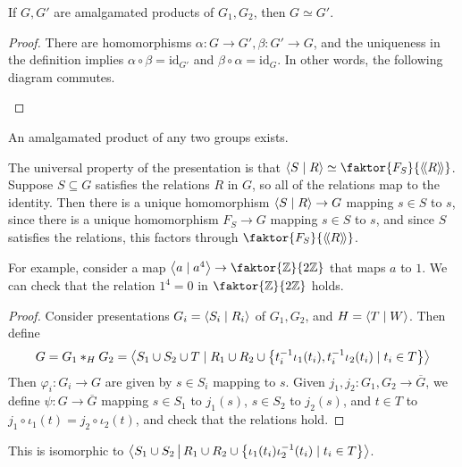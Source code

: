 \begin{proposition}
	If \( G, G' \) are amalgamated products of \( G_1, G_2 \), then \( G \simeq G' \).
\end{proposition}
\begin{proof}
	There are homomorphisms \( \alpha \colon G \to G', \beta \colon G' \to G \), and the uniqueness in the definition implies \( \alpha \circ \beta = \mathrm{id}_{G'} \) and \( \beta \circ \alpha = \mathrm{id}_G \).
	In other words, the following diagram commutes.
	\begin{center}
	\end{center}
\end{proof}
\begin{proposition}
	An amalgamated product of any two groups exists.
\end{proposition}
The universal property of the presentation is that \( \genset{S \mid R} \simeq \faktor{F_S}{\ngenset{R}} \).
Suppose \( S \subseteq G \) satisfies the relations \( R \) in \( G \), so all of the relations map to the identity.
Then there is a unique homomorphism \( \left\langle{} S \mid R \right\rangle \to G \) mapping \( s \in S \) to \( s \), since there is a unique homomorphism \( F_S \to G \) mapping \( s \in S \) to \( s \), and since \( S \) satisfies the relations, this factors through \( \faktor{F_S}{\ngenset{R}} \).

For example, consider a map \( \genset{a \mid a^4} \to \faktor{\mathbb Z}{2\mathbb Z} \) that maps \( a \) to \( 1 \).
We can check that the relation \( 1^4 = 0 \) in \( \faktor{\mathbb Z}{2\mathbb Z} \) holds.
\begin{proof}
	Consider presentations \( G_i = \left\langle{} S_i \mid R_i \right\rangle \) of \( G_1, G_2 \), and \( H = \left\langle{} T \mid W \right\rangle \).
	Then define
	\[ G = G_1 \ast_H G_2 = \left\langle{} S_1 \cup S_2 \cup T \mid R_1 \cup R_2 \cup \qty{t_i^{-1}\iota_1(t_i), t_i^{-1}\iota_2(t_i) \mid t_i \in T} \right\rangle \]
	Then \( \varphi_i \colon G_i \to G \) are given by \( s \in S_i \) mapping to \( s \).
	Given \( j_1, j_2 \colon G_1, G_2 \to \overline G \), we define \( \psi \colon G \to \overline G \) mapping \( s \in S_1 \) to \( j_1(s) \), \( s \in S_2 \) to \( j_2(s) \), and \( t \in T \) to \( j_1 \circ \iota_1(t) = j_2 \circ \iota_2(t) \), and check that the relations hold.
\end{proof}
This is isomorphic to \( \left\langle{} S_1 \cup S_2 \,\middle|\, R_1 \cup R_2 \cup \qty{\iota_1(t_i) \iota_2^{-1}(t_i) \mid t_i \in T} \right\rangle \).

